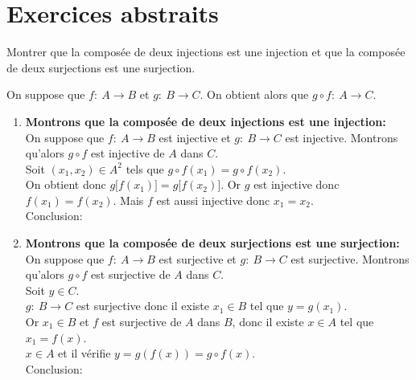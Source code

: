 \documentclass[a4paper, 11pt,reqno]{article}
\begin{document}


\section*{Exercices abstraits}

\begin{exercice}   \;
	Montrer que la compos\'ee de deux injections est une injection et que la compos\'ee de deux surjections est une surjection.
\end{exercice}
\begin{correction} \;
	On suppose que $f:\ A\rightarrow B$ et $g:\ B\rightarrow C$. On obtient alors que $g\circ f:\ A\rightarrow C$.
	\begin{enumerate}
		\item \textbf{Montrons que la compos\'ee de deux injections est une injection:}\\
		      \noindent On suppose que $f:\ A\rightarrow B$ est injective et $g:\ B\rightarrow C$ est injective. Montrons qu'alors $g\circ f$ est injective de $A$ dans $C$.\\
		      \noindent Soit $(x_1,x_2)\in A^2$ tels que $g\circ f(x_1)=g\circ f(x_2)$.\\
		      \noindent On obtient donc $g\lbrack f(x_1)\rbrack=g\lbrack f(x_2)\rbrack$. Or $g$ est injective donc $f(x_1)=f(x_2)$. Mais $f$ est aussi injective donc $x_1=x_2$.\\
		      \noindent Conclusion: 
		\item  \textbf{Montrons que la compos\'ee de deux surjections est une surjection:}\\
		      \noindent
		      On suppose que $f:\ A\rightarrow B$ est surjective et $g:\ B\rightarrow C$ est surjective. Montrons qu'alors $g\circ f$ est surjective de $A$ dans $C$.\\
		      Soit $y\in C$.\\
		      \noindent $g:\ B\rightarrow C$ est surjective donc il existe $x_1\in B$ tel que $y=g(x_1)$.\\
		      \noindent Or $x_1\in B$ et $f$ est surjective de $A$ dans $B$, donc il existe $x\in A$ tel que $x_1=f(x)$.\\
		      \noindent $x\in A$ et il v\'erifie $y=g(f(x))=g\circ f(x)$.\\
		      \noindent Conclusion: 
	\end{enumerate}
\end{correction}
\end{document}
